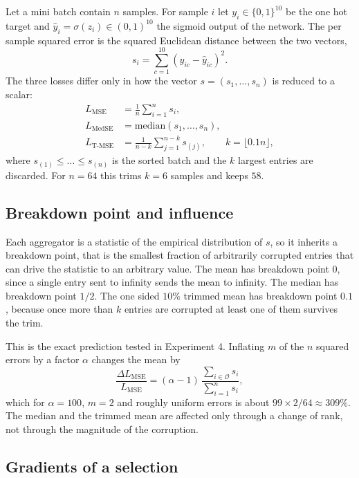 \documentclass[12pt]{article}
\begin{document}
Let a mini batch contain $n$ samples. For sample $i$ let $y_i \in \{0,1\}^{10}$ be the one hot target and $\hat{y}_i = \sigma(z_i) \in (0,1)^{10}$ the sigmoid output of the network. The per sample squared error is the squared Euclidean distance between the two vectors,
\begin{equation}
s_i = \sum_{c=1}^{10} (y_{ic} - \hat{y}_{ic})^2 .
\end{equation}
The three losses differ only in how the vector $s = (s_1, \dots, s_n)$ is reduced to a scalar:
\begin{align}
L_{\mathrm{MSE}} &= \frac{1}{n}\sum_{i=1}^{n} s_i , \\
L_{\mathrm{MedSE}} &= \mathrm{median}(s_1, \dots, s_n) , \\
L_{\mathrm{T\text{-}MSE}} &= \frac{1}{n-k}\sum_{j=1}^{n-k} s_{(j)}, \qquad k = \lfloor 0.1 n \rfloor ,
\end{align}
where $s_{(1)} \le \dots \le s_{(n)}$ is the sorted batch and the $k$ largest entries are discarded. For $n = 64$ this trims $k = 6$ samples and keeps $58$.

\subsection{Breakdown point and influence}

Each aggregator is a statistic of the empirical distribution of $s$, so it inherits a breakdown point, that is the smallest fraction of arbitrarily corrupted entries that can drive the statistic to an arbitrary value. The mean has breakdown point $0$, since a single entry sent to infinity sends the mean to infinity. The median has breakdown point $1/2$. The one sided $10\%$ trimmed mean has breakdown point $0.1$, because once more than $k$ entries are corrupted at least one of them survives the trim.

This is the exact prediction tested in Experiment 4. Inflating $m$ of the $n$ squared errors by a factor $\alpha$ changes the mean by
\begin{equation}
\frac{\Delta L_{\mathrm{MSE}}}{L_{\mathrm{MSE}}} = (\alpha - 1)\,\frac{\sum_{i \in \mathcal{O}} s_i}{\sum_{i=1}^{n} s_i} ,
\label{eq:mseshift}
\end{equation}
which for $\alpha = 100$, $m = 2$ and roughly uniform errors is about $99 \times 2/64 \approx 309\%$. The median and the trimmed mean are affected only through a change of rank, not through the magnitude of the corruption.

\subsection{Gradients of a selection}
\end{document}
